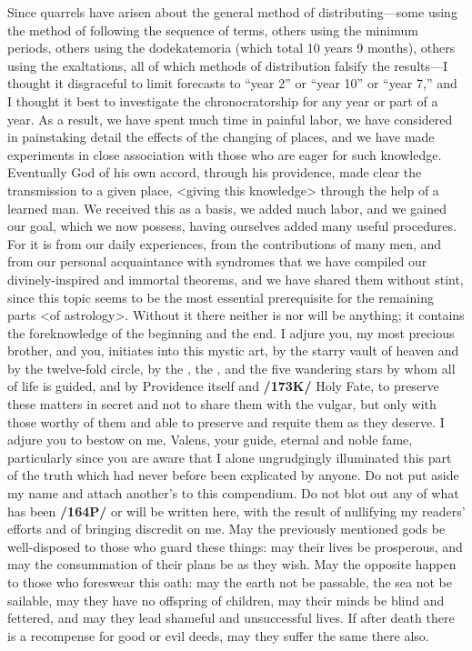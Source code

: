 Since quarrels have arisen about the general method of distributing—some using the method of following the sequence of terms, others using the minimum periods, others using the dodekatemoria (which total 10 years 9 months), others using the exaltations, all of which methods of distribution falsify the results—I thought it disgraceful to limit forecasts to “year 2” or “year 10” or “year 7,” and I thought it best to investigate the chronocratorship for any year or part of a year. As a result, we have spent much time in painful labor, we have considered in painstaking detail the effects of the changing of places, and we have made experiments in close association with those who are eager for such knowledge. Eventually God of his own accord, through his providence, made clear the transmission to a given place, <giving this knowledge> through the help of a learned man. We received this as a basis, we added much labor, and we gained our goal, which we now possess, having ourselves added many useful procedures. For it is from our daily experiences, from the contributions of many men, and from our personal acquaintance with syndromes that we have compiled our divinely-inspired and immortal theorems, and we have shared them without stint, since this topic seems to be the most essential prerequisite for the remaining parts <of astrology>. Without it there neither is nor will be anything; it contains the foreknowledge of the beginning and the end. I adjure you, my most precious brother, and you, initiates into this mystic art, by the starry vault of heaven and by the twelve-fold circle, by the \Sun, the \Moon, and the five wandering stars by whom all of life is guided, and by Providence itself and \textbf{/173K/} Holy Fate, to preserve these matters in secret and not to share them with the vulgar, but only with those worthy of them and able to preserve and requite them as they deserve. I adjure you to bestow on me, Valens, your guide, eternal and noble fame, particularly since you are aware that I alone ungrudgingly illuminated this part of the truth which had never before been explicated by anyone. Do not put aside my name and attach another’s to this compendium. Do not blot out any of what has been \textbf{/164P/} or will be written here, with the result of nullifying my readers’ efforts and of bringing discredit on me. May the previously mentioned gods be well-disposed to those who guard these things: may their lives be prosperous, and may the consummation of their plans be as they wish. May the opposite happen to those who foreswear this oath: may the earth not be passable, the sea not be sailable, may they have no offspring of children, may their minds be blind and fettered, and may they lead shameful and unsuccessful lives. If after death there is a recompense for good or evil deeds, may they suffer the same there also.

